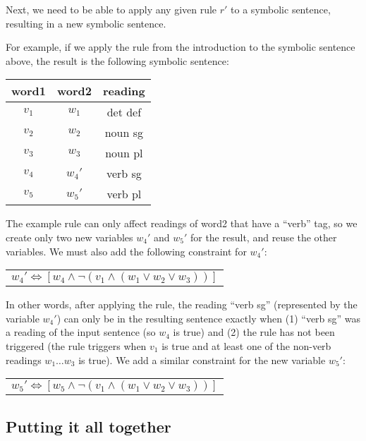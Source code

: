 Next, we need to be able to apply any given rule $r'$ to a symbolic sentence, resulting in a new symbolic sentence.

For example, if we apply the rule from the introduction to the symbolic sentence above, the result is the following symbolic sentence:
\begin{center}
\begin{tabular}{c|c|c}
word1 & word2 & reading \\
\hline
$v_1$ & $w_1$ & det def \\
$v_2$ & $w_2$ & noun sg \\
$v_3$ & $w_3$ & noun pl \\
$v_4$ & $w_4'$ & verb sg \\
$v_5$ & $w_5'$ & verb pl \\
\end{tabular}
\end{center}
The example rule can only affect readings of word2 that have a ``verb'' tag, so we create only two new variables $w_4'$ and $w_5'$ for the result, and reuse the other variables. We must also add the following constraint for $w_4'$:
\begin{center}
\begin{tabular}{c}
$w_4' \Leftrightarrow [ w_4 \wedge \neg{}(v_1 \wedge (w_1 \vee w_2 \vee w_3)) ]$ \\
\end{tabular}
\end{center}
In other words, after applying the rule, the reading ``verb sg'' (represented by the variable $w_4'$) can only be in the resulting sentence exactly when (1) ``verb sg'' was a reading of the input sentence (so $w_4$ is true) and (2) the rule has not been triggered (the rule triggers when $v_1$ is true and at least one of the non-verb readings $w_1 \dots w_3$ is true). We add a similar constraint for the new variable $w_5'$:
\begin{center}
\begin{tabular}{c}
$w_5' \Leftrightarrow [ w_5 \wedge \neg{}(v_1 \wedge (w_1 \vee w_2 \vee w_3)) ]$ \\
\end{tabular}
\end{center}

\subsection{Putting it all together}

